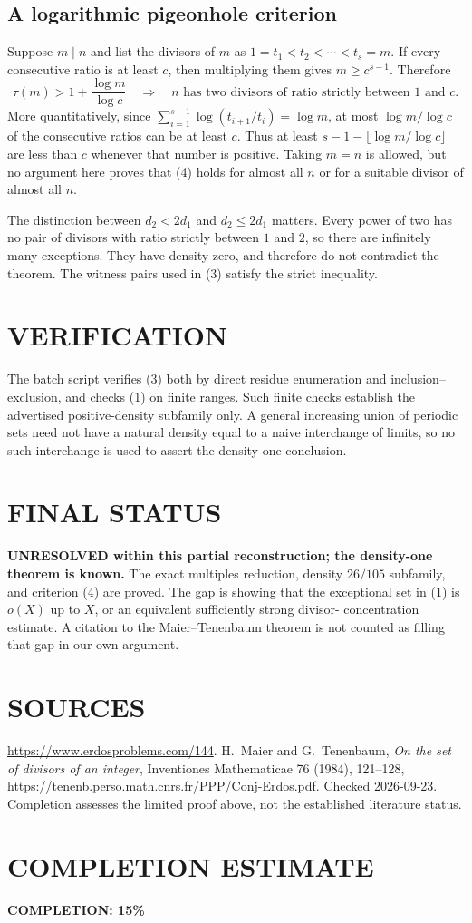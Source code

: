 \subsection*{A logarithmic pigeonhole criterion}
Suppose $m\mid n$ and list the divisors of $m$ as
$1=t_1<t_2<\cdots<t_s=m$. If every consecutive ratio is at least $c$,
then multiplying them gives $m\ge c^{s-1}$. Therefore
\[
 \tau(m)>1+\frac{\log m}{\log c}
 \quad\Longrightarrow\quad
 \text{$n$ has two divisors of ratio strictly between $1$ and $c$}.
                                                               \tag{4}
\]
More quantitatively, since
$\sum_{i=1}^{s-1}\log(t_{i+1}/t_i)=\log m$, at most
$\log m/\log c$ of the consecutive ratios can be at least $c$.
Thus at least $s-1-\lfloor\log m/\log c\rfloor$ are less than $c$
whenever that number is positive. Taking $m=n$ is allowed, but no
argument here proves that (4) holds for almost all $n$ or for a
suitable divisor of almost all $n$.

The distinction between $d_2<2d_1$ and $d_2\le2d_1$ matters. Every
power of two has no pair of divisors with ratio strictly between $1$
and $2$, so there are infinitely many exceptions. They have density
zero, and therefore do not contradict the theorem. The witness pairs
used in (3) satisfy the strict inequality.

\section{VERIFICATION}
The batch script verifies (3) both by direct residue enumeration and
inclusion--exclusion, and checks (1) on finite ranges. Such finite
checks establish the advertised positive-density subfamily only.
A general increasing union of periodic sets need not have a natural
density equal to a naive interchange of limits, so no such interchange
is used to assert the density-one conclusion.

\section{FINAL STATUS}
\textbf{UNRESOLVED within this partial reconstruction; the density-one
theorem is known.}
The exact multiples reduction, density $26/105$ subfamily, and criterion
(4) are proved. The gap is showing that the exceptional set in (1)
is $o(X)$ up to $X$, or an equivalent sufficiently strong divisor-
concentration estimate. A citation to the Maier--Tenenbaum theorem
is not counted as filling that gap in our own argument.

\section{SOURCES}
\url{https://www.erdosproblems.com/144}.
H.~Maier and G.~Tenenbaum, \emph{On the set of divisors of an integer},
Inventiones Mathematicae 76 (1984), 121--128,
\url{https://tenenb.perso.math.cnrs.fr/PPP/Conj-Erdos.pdf}.
Checked 2026-09-23. Completion assesses the limited proof above, not
the established literature status.

\section{COMPLETION ESTIMATE}
\textbf{COMPLETION: 15\%}
